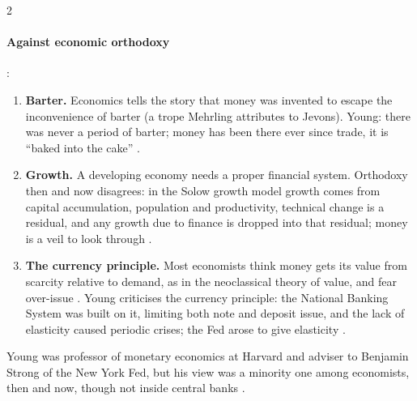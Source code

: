 \begin{paracol}{2}
\paragraph{Against economic orthodoxy} :
\begin{enumerate}
  \item \textbf{Barter.} Economics tells the story that money was invented to escape the inconvenience of barter (a trope Mehrling
        attributes to Jevons). Young: there was never a period of barter; money has been there ever since trade, it is
        ``baked into the cake'' .
  \item \textbf{Growth.} A developing economy needs a proper financial system. Orthodoxy then and now disagrees: in the Solow growth
        model growth comes from capital accumulation, population and productivity, technical change is a residual, and any
        growth due to finance is dropped into that residual; money is a veil to look through .
  \item \textbf{The currency principle.} Most economists think money gets its value from scarcity relative to demand, as in the
        neoclassical theory of value, and fear over-issue . Young criticises the currency principle:
        the National Banking System was built on it, limiting both note and deposit issue, and the lack of elasticity caused
        periodic crises; the Fed arose to give elasticity .
\end{enumerate}
Young was professor of monetary economics at Harvard and adviser to Benjamin Strong of the New York Fed, but his view was a
minority one among economists, then and now, though not inside central banks .


\end{paracol}
